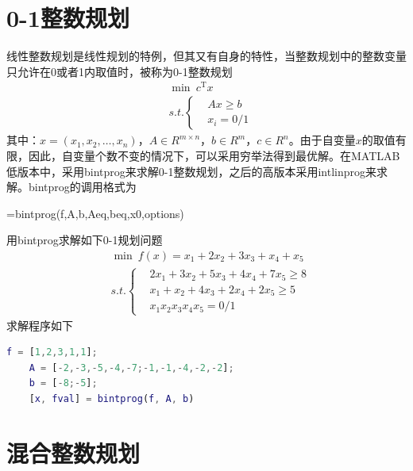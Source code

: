 \section{0-1整数规划}
    \par
    线性整数规划是线性规划的特例，但其又有自身的特性，当整数规划中的整数变量只允许在0或者1内取值时，被称为0-1整数规划
    \begin{align*}
    & \mathop{\min}\ c^\mathrm{T} x\\
    &s.t.\left\{
    \begin{aligned}
    &Ax \geqslant b\\
    &x_i = 0/1
    \end{aligned}
    \right.
    \end{align*}
    其中：$x=(x_1,x_2,\ldots,x_n)$，$A \in R^{m\times n}$，$b \in R^m$，$c \in R^n$。由于自变量$x$的取值有限，因此，自变量个数不变的情况下，可以采用穷举法得到最优解。在MATLAB低版本中，采用bintprog来求解0-1整数规划，之后的高版本采用intlinprog来求解。bintprog的调用格式为
    \par
    [x,fval,exitflag,output]=bintprog(f,A,b,Aeq,beq,x0,options)
    \par
    用bintprog求解如下0-1规划问题
    \begin{align*}
    &\mathop {\min} \ f(x)=x_1+2x_2+3x_3+x_4+x_5\\
    &s.t.\left\{
    \begin{aligned}
    &2x_1+3x_2+5x_3+4x_4+7x_5 \geqslant 8\\
    &x_1+x_2+4x_3+2x_4+2x_5 \geqslant 5\\
    &x_1x_2x_3x_4x_5 = 0/1
    \end{aligned}
    \right.
    \end{align*}
    求解程序如下
    \begin{lstlisting}[language=Matlab]
    f = [1,2,3,1,1];
    A = [-2,-3,-5,-4,-7;-1,-1,-4,-2,-2];
    b = [-8;-5];
    [x, fval] = bintprog(f, A, b)
    \end{lstlisting}

\section{混合整数规划}
